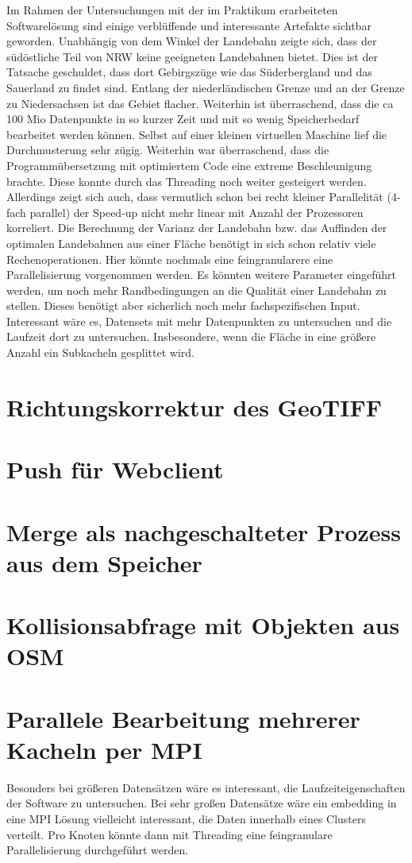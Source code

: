 \documentclass[10pt,a4paper]{report}
\begin{document}
Im Rahmen der Untersuchungen mit der im Praktikum erarbeiteten Softwarelösung sind einige verblüffende und interessante Artefakte sichtbar geworden.
Unabhängig von dem Winkel der Landebahn zeigte sich, dass der südöstliche Teil von NRW keine geeigneten Landebahnen bietet. Dies ist der Tatsache geschuldet, dass dort Gebirgszüge wie das Süderbergland und das Sauerland zu findet sind.
Entlang der niederländischen Grenze und an der Grenze zu Niedersachsen ist das Gebiet flacher.
Weiterhin ist überraschend, dass die ca 100 Mio Datenpunkte in so kurzer Zeit und mit so wenig Speicherbedarf bearbeitet werden können. Selbst auf einer kleinen virtuellen Maschine lief die Durchmusterung sehr zügig.
Weiterhin war überraschend, dass die Programmübersetzung mit optimiertem Code eine extreme Beschleunigung brachte.
Diese konnte durch das Threading noch weiter gesteigert werden.
Allerdings zeigt sich auch, dass vermutlich schon bei recht kleiner Parallelität (4-fach parallel) der Speed-up nicht mehr linear mit Anzahl der Prozessoren korreliert.
Die Berechnung der Varianz der Landebahn bzw. das Auffinden der optimalen Landebahnen aus einer Fläche benötigt in sich schon relativ viele Rechenoperationen. Hier könnte nochmals eine feingranularere eine Parallelisierung vorgenommen werden.
Es könnten weitere Parameter eingeführt werden, um noch mehr Randbedingungen an die Qualität einer Landebahn zu stellen. Dieses benötigt aber sicherlich noch mehr fachspezifischen Input.
Interessant wäre es, Datensets mit mehr Datenpunkten zu untersuchen und die Laufzeit dort zu untersuchen. Insbesondere, wenn die Fläche in eine größere Anzahl ein Subkacheln gesplittet wird.
 
\section{Richtungskorrektur des GeoTIFF}
\section{Push für Webclient}
\section{Merge als nachgeschalteter Prozess aus dem Speicher}
\section{Kollisionsabfrage mit Objekten aus OSM}
\section{Parallele Bearbeitung mehrerer Kacheln per MPI}
Besonders bei größeren Datensätzen wäre es interessant, die Laufzeiteigenschaften der Software zu untersuchen. Bei sehr großen Datensätze wäre ein embedding in eine MPI Lösung vielleicht interessant, die Daten innerhalb eines Clusters verteilt. Pro Knoten könnte dann mit Threading eine feingranulare Parallelisierung durchgeführt werden.
\end{document}
